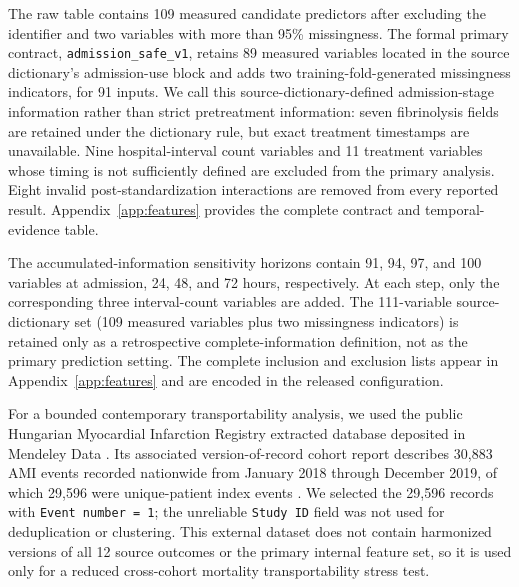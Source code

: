 \documentclass{ieeeaccess}
\begin{document}
The raw table contains 109 measured candidate predictors after excluding the identifier and two variables with more than 95\% missingness. The formal primary contract, \texttt{admission\_safe\_v1}, retains 89 measured variables located in the source dictionary's admission-use block and adds two training-fold-generated missingness indicators, for 91 inputs. We call this source-dictionary-defined admission-stage information rather than strict pretreatment information: seven fibrinolysis fields are retained under the dictionary rule, but exact treatment timestamps are unavailable. Nine hospital-interval count variables and 11 treatment variables whose timing is not sufficiently defined are excluded from the primary analysis. Eight invalid post-standardization interactions are removed from every reported result. Appendix~\ref{app:features} provides the complete contract and temporal-evidence table.

The accumulated-information sensitivity horizons contain 91, 94, 97, and 100 variables at admission, 24, 48, and 72 hours, respectively. At each step, only the corresponding three interval-count variables are added. The 111-variable source-dictionary set (109 measured variables plus two missingness indicators) is retained only as a retrospective complete-information definition, not as the primary prediction setting. The complete inclusion and exclusion lists appear in Appendix~\ref{app:features} and are encoded in the released configuration.

For a bounded contemporary transportability analysis, we used the public Hungarian Myocardial Infarction Registry extracted database deposited in Mendeley Data \cite{almurshedi2026data}. Its associated version-of-record cohort report describes 30,883 AMI events recorded nationwide from January 2018 through December 2019, of which 29,596 were unique-patient index events \cite{balint2026}. We selected the 29,596 records with \texttt{Event number = 1}; the unreliable \texttt{Study ID} field was not used for deduplication or clustering. This external dataset does not contain harmonized versions of all 12 source outcomes or the primary internal feature set, so it is used only for a reduced cross-cohort mortality transportability stress test.
\end{document}

